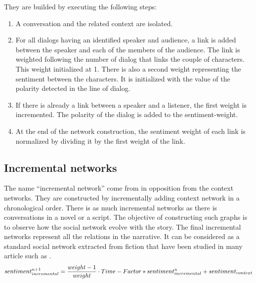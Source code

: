 \documentclass[a4paper, 12pt]{report}
\begin{document}
They are builded by executing the following steps:
\begin{enumerate}
\item A conversation and the related context are isolated.
\item For all dialogs having an identified speaker and audience, a link is added between the speaker and each of the members of the audience. The link is weighted following the number of dialog that links the couple of characters. This weight initialized at 1. There is also a second weight representing the sentiment between the characters. It is initialized with the value of the polarity detected in the line of dialog.
\item If there is already a link between a speaker and a listener, the first weight is incremented.  The polarity of the dialog is added to the sentiment-weight.
\item At the end of the network construction, the sentiment weight of each link is normalized by dividing it by the first weight of the link.
\end{enumerate}

\subsection{Incremental networks}
The name ``incremental network'' come from \cite{original} in opposition from the context networks. They are constructed by incrementally adding context network in a chronological order. There is as much incremental networks as there is conversations in a novel or a script. The objective of constructing such graphs is to observe how the social network evolve with the story.
The final incremental networks represent all the relations in the narrative. It can be considered as a standard social network extracted from fiction that have been studied in many article such as \cite{agarwal-etal-2013-automatic, NER, character_country, movie, fiction, Dekker2018EvaluatingSN}.\\

\begin{equation}
sentiment_{incremental}^{n+1} = \frac{weight - 1}{weight} \cdot Time-Factor * sentiment_{incremental}^{n} + sentiment_{context}\\
\label{sentiment}
\end{equation}
\end{document}
